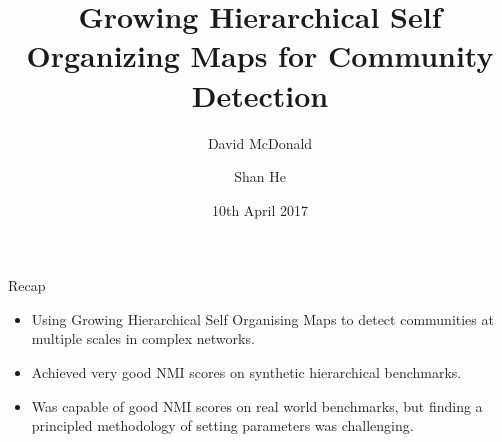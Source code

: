 \documentclass{beamer}
\title[GHSOM for Community Detection]{Growing Hierarchical Self Organizing Maps for Community Detection}
\author{David McDonald \and Shan He}
\date{10th April 2017}
\begin{document}
	
	\begin{frame}
		\titlepage
	\end{frame}
	
	\begin{frame}{Recap}
		
		\begin{itemize}
			\item Using Growing Hierarchical Self Organising Maps to detect communities at multiple scales in complex networks. 
			\item Achieved very good NMI scores on synthetic hierarchical benchmarks.
			\item Was capable of good NMI scores on real world benchmarks, but finding a principled methodology of setting parameters was challenging.
		\end{itemize}
		
	\end{frame}
	
\end{document}
